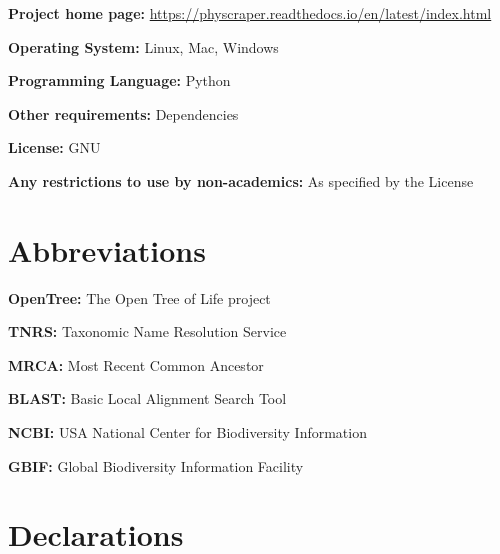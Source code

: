 \documentclass{bmcart}
\begin{document}
\textbf{Project home page:} \href{https://physcraper.readthedocs.io/en/latest/index.html}{https://physcraper.readthedocs.io/en/latest/index.html}

\textbf{Operating System:} Linux, Mac, Windows

\textbf{Programming Language:} Python

\textbf{Other requirements:} Dependencies

\textbf{License:} GNU

\textbf{Any restrictions to use by non-academics:} As specified by the License

\section*{Abbreviations}

\textbf{OpenTree:} The Open Tree of Life project

\textbf{TNRS:} Taxonomic Name Resolution Service

\textbf{MRCA:} Most Recent Common Ancestor

\textbf{BLAST:} Basic Local Alignment Search Tool

\textbf{NCBI:} USA National Center for Biodiversity Information

\textbf{GBIF:} Global Biodiversity Information Facility

\section*{Declarations}
\end{document}
